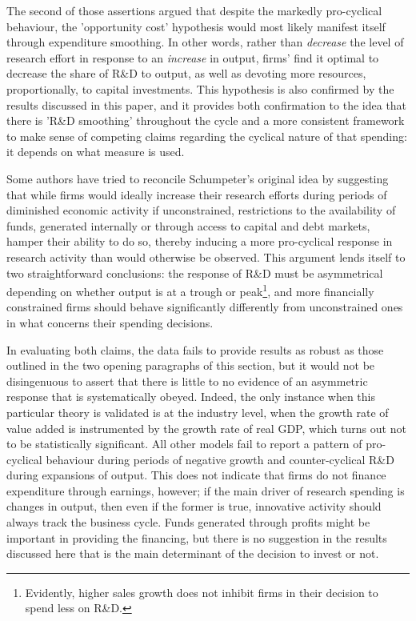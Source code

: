 \documentclass{_latex/house}
\begin{document}
The second of those assertions argued that despite the markedly pro-cyclical behaviour, the 'opportunity cost' hypothesis would most likely manifest itself through expenditure smoothing. In other words, rather than \textit{decrease} the level of research effort in response to an \textit{increase} in output, firms' find it optimal to decrease the share of R\&D to output, as well as devoting more resources, proportionally, to capital investments. This hypothesis is also confirmed by the results discussed in this paper, and it provides both confirmation to the idea that there is 'R\&D smoothing' throughout the cycle and a more consistent framework to make sense of competing claims regarding the cyclical nature of that spending: it depends on what measure is used.

Some authors have tried to reconcile Schumpeter's original idea by suggesting that while firms would ideally increase their research efforts during periods of diminished economic activity if unconstrained, restrictions to the availability of funds, generated internally or through access to capital and debt markets, hamper their ability to do so, thereby inducing a more pro-cyclical response in research activity than would otherwise be observed. This argument lends itself to two straightforward conclusions: the response of R\&D must be asymmetrical depending on whether output is at a trough or peak\footnote{Evidently, higher sales growth does not inhibit firms in their decision to spend less on R\&D.}, and more financially constrained firms should behave significantly differently from unconstrained ones in what concerns their spending decisions.

In evaluating both claims, the data fails to provide results as robust as those outlined in the two opening paragraphs of this section, but it would not be disingenuous to assert that there is little to no evidence of an asymmetric response that is systematically obeyed. Indeed, the only instance when this particular theory is validated is at the industry level, when the growth rate of value added is instrumented by the growth rate of real GDP, which turns out not to be statistically significant. All other models fail to report a pattern of pro-cyclical behaviour during periods of negative growth and counter-cyclical R\&D during expansions of output. This does not indicate that firms do not finance expenditure through earnings, however; if the main driver of research spending is changes in output, then even if the former is true, innovative activity should always track the business cycle. Funds generated through profits might be important in providing the financing, but there is no suggestion in the results discussed here that is the main determinant of the decision to invest or not.
\end{document}
